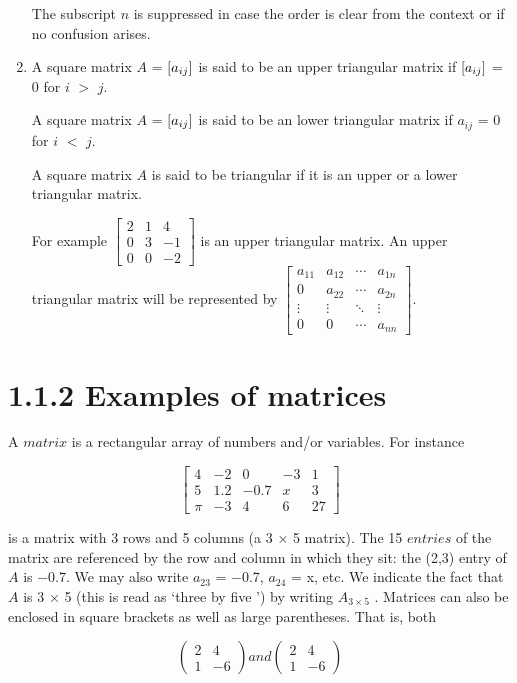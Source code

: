 \documentclass{book}
\begin{document}
\begin{enumerate}
The subscript $n$ is suppressed in case the order is clear from the context or if no confusion arises.
\item A square matrix $A$ = $\small[a_{ij}\small]$ is said to be an upper triangular matrix if $\small[a_{ij}\small]$ = 0 for $i$ $>$  $j$.

A square matrix $A$ = $\small[a_{ij} \small]$ is said to be an lower triangular matrix if $a_{ij}$ = 0 for $i$ $<$ $j$.

A square matrix $A$ is said to be triangular if it is an upper or a lower triangular matrix.

For example $\begin{bmatrix} 
	2 & 1 & 4 \\
	0 & 3 & -1 \\
	0 & 0 & -2 
	\end{bmatrix}$ is an upper triangular matrix. An upper triangular matrix will be represented by $\begin{bmatrix}
		a_{11} & a_{12} & \cdots &a_{1n} \\
		0 & a_{22} & \cdots& a_{2n} \\
		\vdots & \vdots & \ddots & \vdots \\
		0 & 0 & \cdots & a_{nn}
\end{bmatrix}$.
\end{enumerate}


\section*{1.1.2 Examples of matrices}
A $matrix$ is a rectangular array of numbers and/or variables. For instance

$$ \begin{bmatrix} 
4 & -2 & 0 & -3 & 1 \\
5 & 1.2 & -0.7 & x & 3 \\
\pi & -3 & 4 & 6 & 27 \end{bmatrix} $$

is a matrix with 3 rows and 5 columns (a 3 $\times$ 5 matrix). The 15 $entries$ of the matrix are referenced by the row and column in which they sit: the (2,3) entry of $A$ is −0.7. We may also write $a_{23}$ = −0.7, $a_{24}$ = x, etc. We indicate the fact that $A$ is 3 × 5 (this is read as \lq three by five \rq) by writing $A_{3×5}$ . Matrices can also be enclosed in square brackets as well as
large parentheses. That is, both 

$$ \begin{pmatrix} 
2 & 4 \\
	1 & -6\end{pmatrix} and \begin{pmatrix} 
2 & 4 \\
1 & -6\end{pmatrix}$$
\end{document}
